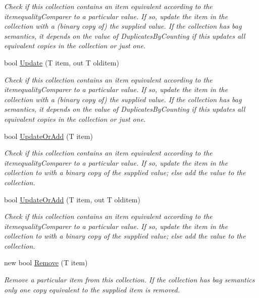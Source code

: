 \begin{DoxyCompactItemize}
\begin{DoxyCompactList}\small\item\em Check if this collection contains an item equivalent according to the itemequality\+Comparer to a particular value. If so, update the item in the collection with a (binary copy of) the supplied value. If the collection has bag semantics, it depends on the value of Duplicates\+By\+Counting if this updates all equivalent copies in the collection or just one. \end{DoxyCompactList}\item 
bool \hyperlink{interface_c5_1_1_i_collection_ad1faa1738e02acf001aac16a3b948c78}{Update} (T item, out T olditem)
\begin{DoxyCompactList}\small\item\em Check if this collection contains an item equivalent according to the itemequality\+Comparer to a particular value. If so, update the item in the collection with a (binary copy of) the supplied value. If the collection has bag semantics, it depends on the value of Duplicates\+By\+Counting if this updates all equivalent copies in the collection or just one. \end{DoxyCompactList}\item 
bool \hyperlink{interface_c5_1_1_i_collection_a9739490d6271fb3a92221bca5da5e54b}{Update\+Or\+Add} (T item)
\begin{DoxyCompactList}\small\item\em Check if this collection contains an item equivalent according to the itemequality\+Comparer to a particular value. If so, update the item in the collection to with a binary copy of the supplied value; else add the value to the collection. \end{DoxyCompactList}\item 
bool \hyperlink{interface_c5_1_1_i_collection_a73a5d984e95e200de80261361bb7e57d}{Update\+Or\+Add} (T item, out T olditem)
\begin{DoxyCompactList}\small\item\em Check if this collection contains an item equivalent according to the itemequality\+Comparer to a particular value. If so, update the item in the collection to with a binary copy of the supplied value; else add the value to the collection. \end{DoxyCompactList}\item 
new bool \hyperlink{interface_c5_1_1_i_collection_ab4d6092ac09245ce46db91595fc1cdfe}{Remove} (T item)
\begin{DoxyCompactList}\small\item\em Remove a particular item from this collection. If the collection has bag semantics only one copy equivalent to the supplied item is removed. \end{DoxyCompactList}\item 

\end{DoxyCompactItemize}
